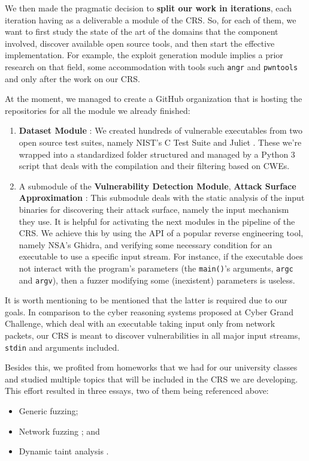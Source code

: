 \documentclass[12pt,a4paper,english,onecolumn]{IEEEtran}
\begin{document}
We then made the pragmatic decision to \textbf{split our work in iterations}, each iteration having as a deliverable a module of the CRS. So, for each of them, we want to first study the state of the art of the domains that the component involved, discover available open source tools, and then start the effective implementation. For example, the exploit generation module implies a prior research on that field, some accommodation with tools such \texttt{angr} and \texttt{pwntools} and only after the work on our CRS.

At the moment, we managed to create a GitHub organization \cite{crs_org} that is hosting the repositories for all the module we already finished:
\begin{enumerate}
    \item \textbf{Dataset Module} \cite{dataset_repo}: We created hundreds of vulnerable executables from two open source test suites, namely NIST's C Test Suite \cite{nist_c_test_suite} and Juliet \cite{juliet_testcase}. These we're wrapped into a standardized folder structured and managed by a Python 3 script that deals with the compilation and their filtering based on CWEs.
    \item  A submodule of the \textbf{Vulnerability Detection Module}, \textbf{Attack Surface Approximation} \cite{surface_repo}: This submodule deals with the static analysis of the input binaries for discovering their attack surface, namely the input mechanism they use. It is helpful for activating the next modules in the pipeline of the CRS. We achieve this by using the API of a popular reverse engineering tool, namely NSA's Ghidra, and verifying some necessary condition for an executable to use a specific input stream. For instance, if the executable does not interact with the program's parameters (the \texttt{main()}'s arguments, \texttt{argc} and \texttt{argv}), then a fuzzer modifying some (inexistent) parameters is useless.
\end{enumerate}

It is worth mentioning to be mentioned that the latter is required due to our goals. In comparison to the cyber reasoning systems proposed at Cyber Grand Challenge, which deal with an executable taking input only from network packets, our CRS is meant to discover vulnerabilities in all major input streams, \texttt{stdin} and arguments included.

Besides this, we profited from homeworks that we had for our university classes and studied multiple topics that will be included in the CRS we are developing. This effort resulted in three essays, two of them being referenced above:
\begin{itemize}
    \item Generic fuzzing;
    \item Network fuzzing \cite{network_fuzzing_essay_repo}; and
    \item Dynamic taint analysis \cite{dta_essay_repo}.
\end{itemize}
\end{document}
